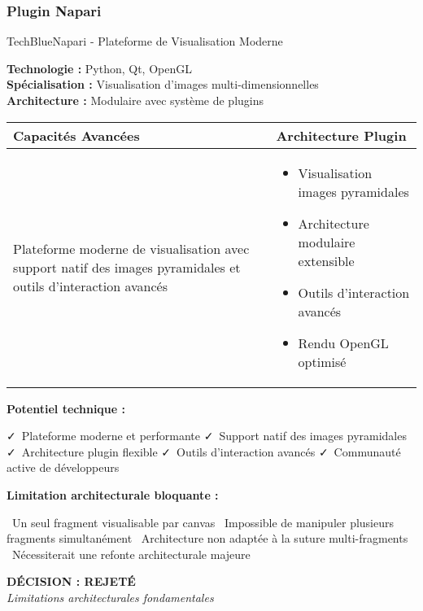 \documentclass[11pt,a4paper]{report}
\newcommand{\pro}[1]{\textcolor{SuccessGreen}{\faCheck\ #1}}
\newcommand{\con}[1]{\textcolor{DangerRed}{\faTimes\ #1}}
\begin{document}
\subsubsection{Plugin Napari}

\begin{techbox}{TechBlue}{Napari - Plateforme de Visualisation Moderne}

\textbf{Technologie :} Python, Qt, OpenGL \\
\textbf{Spécialisation :} Visualisation d'images multi-dimensionnelles \\
\textbf{Architecture :} Modulaire avec système de plugins

\vspace{0.5cm}

\begin{tabularx}{\textwidth}{|X|X|}
\hline
\rowcolor{LightGray}
\textbf{Capacités Avancées} & \textbf{Architecture Plugin} \\
\hline
Plateforme moderne de visualisation avec support natif des images pyramidales et outils d'interaction avancés &
\begin{itemize}[nosep]
\item Visualisation images pyramidales
\item Architecture modulaire extensible
\item Outils d'interaction avancés
\item Rendu OpenGL optimisé
\end{itemize} \\
\hline
\end{tabularx}

\vspace{0.5cm}

\textbf{Potentiel technique :}
\begin{itemize}[leftmargin=*]
    \pro{Plateforme moderne et performante}
    \pro{Support natif des images pyramidales}
    \pro{Architecture plugin flexible}
    \pro{Outils d'interaction avancés}
    \pro{Communauté active de développeurs}
\end{itemize}

\textbf{Limitation architecturale bloquante :}
\begin{itemize}[leftmargin=*]
    \con{Un seul fragment visualisable par canvas}
    \con{Impossible de manipuler plusieurs fragments simultanément}
    \con{Architecture non adaptée à la suture multi-fragments}
    \con{Nécessiterait une refonte architecturale majeure}
\end{itemize}

\begin{center}
\textbf{\textcolor{DangerRed}{DÉCISION : REJETÉ}}\\
\textit{Limitations architecturales fondamentales}
\end{center}

\end{techbox}
\end{document}
